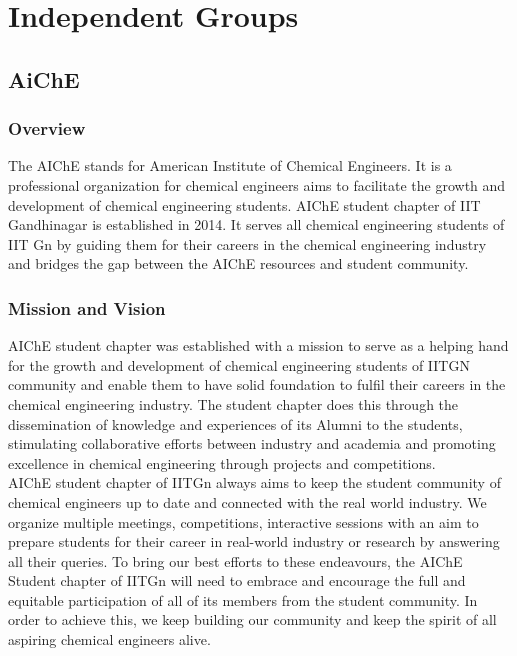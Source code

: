 \documentclass[12pt]{article}
\begin{document}
\newpage
\section{Independent Groups}

\subsection{AiChE}
\subsubsection{Overview}
The AIChE stands for American Institute of Chemical Engineers. It is a professional organization for chemical engineers aims to facilitate the growth and development of chemical engineering students. AIChE student chapter of IIT Gandhinagar is established in 2014. It serves all chemical engineering students of IIT Gn by guiding them for their careers in the chemical engineering industry and bridges the gap between the AIChE resources and student community.

\subsubsection{Mission and Vision}
AIChE student chapter was established with a mission to serve as a helping hand for the growth and development of chemical engineering students of IITGN community and enable them to have solid foundation to fulfil their careers in the chemical engineering industry. The student chapter does this through the dissemination of knowledge and experiences of its Alumni to the students, stimulating collaborative efforts between industry and academia and promoting excellence in chemical engineering through projects and competitions.\\

\noindent AIChE student chapter of IITGn always aims to keep the student community of chemical engineers up to date and connected with the real world industry. We organize multiple meetings, competitions, interactive sessions with an aim to prepare students for their career in real-world industry or research by answering all their queries. To bring our best efforts to these endeavours, the AIChE Student chapter of IITGn will need to embrace and encourage the full and equitable participation of all of its members from the student community. In order to achieve this, we keep building our community and keep the spirit of all aspiring chemical engineers alive.
\end{document}
